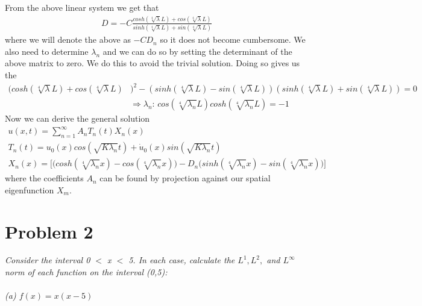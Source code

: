 \documentclass[12pt]{article}
\theoremstyle{remark}
\begin{document}
From the above linear system we get that 
	\begin{align*}
	D = -C\frac{cosh(\sqrt[4]{\lambda}L) + cos(\sqrt[4]{\lambda}L)}{sinh(\sqrt[4]{\lambda}L) + sin(\sqrt[4]{\lambda}L)} 
\end{align*}
where we will denote the above as $-CD_n$ so it does not become cumbersome. We also need to determine $\lambda_n$ and we can do so by setting the determinant of the above matrix to zero. We do this to avoid the trivial solution. Doing so gives us the 
\begin{align*}
	(cosh(\sqrt[4]{\lambda}L) + cos(\sqrt[4]{\lambda}L)&)^2 - (sinh(\sqrt[4]{\lambda}L) - sin(\sqrt[4]{\lambda}L))(sinh(\sqrt[4]{\lambda}L) + sin(\sqrt[4]{\lambda}L)) = 0 \\
	& \Rightarrow \lambda_n: \, cos(\sqrt[4]{\lambda_n}L)cosh(\sqrt[4]{\lambda_n}L) = -1
\end{align*}
Now we can derive the general solution
\begin{gather*}
	u(x,t) = \sum\limits_{n=1}^\infty A_nT_n(t)X_n(x) \\
	T_n(t) = u_0(x)cos(\sqrt{K\lambda_n}t) + \dot{u}_0(x)sin(\sqrt{K\lambda_n}t) \\
	X_n(x) = \bigg[\bigg(cosh(\sqrt[4]{\lambda_n}x) - cos(\sqrt[4]{\lambda_n}x)\bigg) - D_n\bigg(sinh(\sqrt[4]{\lambda_n}x) - sin(\sqrt[4]{\lambda_n}x)\bigg)\bigg] 
\end{gather*}
where the coefficients $A_n$ can be found by projection against our spatial eigenfunction $X_m$.

\newpage

\section*{Problem 2} 
\textit{Consider the interval 0 $<$ x $<$ 5. In each case, calculate the $L^1, L^2,$ and $L^\infty$ norm of each function on the interval (0,5):} \\ \\
\textit{(a) $f(x) = x(x-5)$} \\
\end{document}
